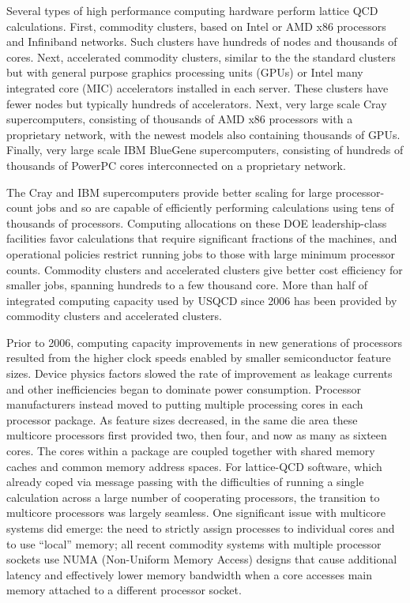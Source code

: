 Several types of high performance computing hardware perform lattice QCD
calculations.  First, commodity clusters, based on Intel or AMD x86 processors
and Infiniband networks.  Such clusters have hundreds of nodes and thousands
of cores.  Next, accelerated commodity clusters, similar to the the standard
clusters but with general purpose graphics processing units (GPUs) or Intel
many integrated core (MIC) accelerators installed in each server.  These
clusters have fewer nodes but typically hundreds of accelerators.  Next, very
large scale Cray supercomputers, consisting of thousands of AMD x86 processors
with a proprietary network, with the newest models also containing thousands
of GPUs.  Finally, very large scale IBM BlueGene supercomputers, consisting
of hundreds of thousands of PowerPC cores interconnected on a proprietary
network.

The Cray and IBM supercomputers provide better scaling for large
processor-count jobs and so are capable of efficiently performing calculations
using tens of thousands of processors.  Computing allocations on these DOE
leadership-class facilities favor calculations that require significant
fractions of the machines, and operational policies restrict running jobs to
those with large minimum processor counts.  Commodity clusters and accelerated
clusters give better cost efficiency for smaller jobs, spanning hundreds to a
few thousand core.
More than half of integrated computing capacity used by USQCD
since 2006 has been provided by commodity clusters and accelerated clusters.

Prior to 2006, computing capacity improvements in new generations of
processors resulted from the higher clock speeds enabled by smaller
semiconductor feature sizes.  Device physics factors slowed the rate of
improvement as leakage currents and other inefficiencies began to dominate
power consumption.  Processor manufacturers instead moved to putting multiple
processing cores in each processor package.  As feature sizes decreased, in
the same die area these multicore processors first provided two, then four,
and now as many as sixteen cores.  The cores within a package are coupled
together with shared memory caches and common memory address spaces.  For lattice-QCD
software, which already coped via message passing with the difficulties of
running a single calculation across a large number of cooperating processors,
the transition to multicore processors was largely seamless.  One significant
issue with multicore systems did emerge: the need to strictly assign processes
to individual cores and to use ``local'' memory; all recent commodity systems
with multiple processor sockets use NUMA (Non-Uniform Memory Access) designs
that cause additional latency and effectively lower memory bandwidth when a
core accesses main memory attached to a different processor socket.   

